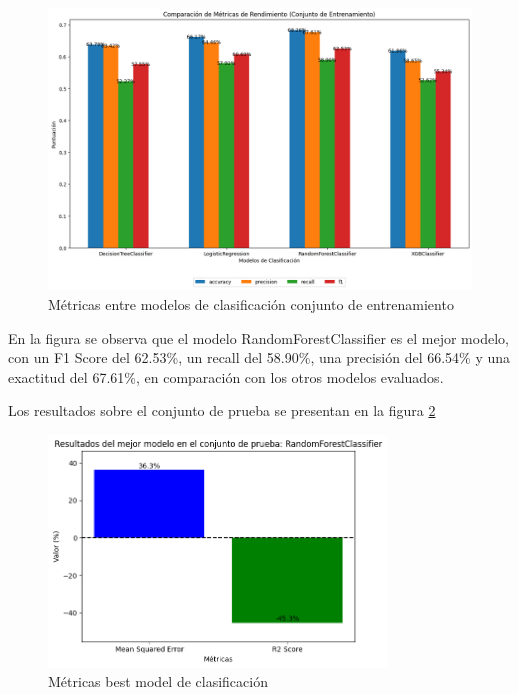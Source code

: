 \begin{figure}[H]
    \centering
    \includegraphics[width=1\textwidth]{img/compara_algoritmos/metricasEntreModelosClasificacion.png}
    \caption{Métricas entre modelos de clasificación conjunto de entrenamiento}
    \label{fig:metricas_clasificacion}
\end{figure}

En la figura se observa que el modelo RandomForestClassifier es el mejor modelo, con un F1 Score del 62.53\%, un recall del 58.90\%, una precisión del 66.54\% y una exactitud del 67.61\%, en comparación con los otros modelos evaluados.

Los resultados sobre el conjunto de prueba se presentan en la figura \ref{fig:metricas_clasificacion_bestModel}

\begin{figure}[H]
    \centering
    \includegraphics[width=0.8\textwidth]{img/compara_algoritmos/metricasBestModelRandomForesClassifier.png}
    \caption{Métricas best model de clasificación}
    \label{fig:metricas_clasificacion_bestModel}
\end{figure}

